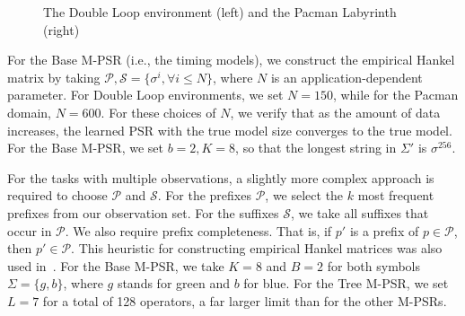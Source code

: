 \documentclass[letterpaper]{article}
\newcommand{\Ps}{\mathcal{P}}
\newcommand{\Ss}{\mathcal{S}}
\begin{document}
\begin{figure}[t]
\centering
{}
%
{}
\caption{The Double Loop environment (left) and the Pacman Labyrinth (right)\label{overflow}\vspace*{-4mm}}
\end{figure}

For the Base M-PSR (i.e., the timing models), we construct the empirical Hankel matrix by taking $\Ps, \Ss = \{\sigma^i, \forall i \leq N\}$, where $N$ is an application-dependent parameter. For Double Loop environments, we set $N = 150$, while for the Pacman domain, $N = 600$. For these choices of $N$, we verify that as the amount of data increases, the learned PSR with the true model size converges to the true model. For the Base M-PSR, we set $b=2, K=8$, so that the longest string in $\Sigma'$ is $\sigma^{256}$.

For the tasks with multiple observations, a slightly more complex approach is required to choose $\Ps$ and $\Ss$. For the prefixes $\Ps$, we select the $k$ most frequent prefixes from our observation set. For the suffixes $\Ss$, we take all suffixes that occur in $\Ps$. We also require prefix completeness. That is, if $p'$ is a prefix of $p \in \Ps$, then $p' \in \Ps$. This heuristic for constructing empirical Hankel matrices was also used in~\cite{icml12}. For the Base M-PSR, we take $K=8$ and $B=2$ for both symbols $\Sigma=\{g,b\}$, where $g$ stands for green and $b$ for blue. For the Tree M-PSR, we set $L=7$ for a total of 128 operators, a far larger limit  than for the other M-PSRs. 
\end{document}
